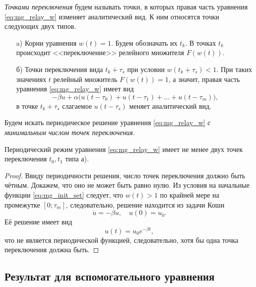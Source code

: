 \emph{Точками переключения} будем называть точки, в которых правая часть уравнения \eqref{eq:mg_relay_w} изменяет аналитический вид. К ним относятся точки следующих двух типов.
\begin{enumerate}
	\item[a)] Корни уравнения $w(t) = 1$. Будем обозначать их $t_k$.
	В точках $t_k$ происходит <<переключение>> релейного множителя $F(w(t))$.
	\item[б)] Точки переключения вида $t_k + \tau_s$ при условии $w(t_k + \tau_s) < 1$. При таких значениях $t$ релейный множитель $F(w(t)) = 1$, а значит, правая часть уравнения \eqref{eq:mg_relay_w} имеет вид
	\begin{equation*}
		-\beta u+\alpha \big(u(t-\tau_0)+u(t-\tau_1)+\ldots+u(t-\tau_{m})\big),
	\end{equation*}
	в точке $t_k + \tau_s$ слагаемое $u(t - \tau_s)$ меняет аналитический вид.
\end{enumerate}

Будем искать периодическое решение уравнения \eqref{eq:mg_relay_w} \emph{с минимальным числом точек переключения}.

\begin{theorem}
	\label{prop:switching_points_2}
	Периодический режим уравнения \eqref{eq:mg_relay_w} имеет не менее двух точек переключения $t_0, t_1$ типа а).
\end{theorem}
\begin{proof}
	Ввиду периодичности решения, число точек переключения должно быть чётным. Докажем, что оно не может быть равно нулю. Из условия на начальные функции \eqref{eq:mg_init_set} следует, что $w(t) > 1$ по крайней мере на промежутке $[0; \tau_m]$, следовательно, решение находится из задачи Коши
	\begin{equation*}
		\dot{u} = -\beta u, \quad u(0) = u_0.
	\end{equation*}
	Её решение имеет вид
	\begin{equation*}
		u(t) = u_0 e^{-\beta t},
	\end{equation*}
	что не является периодической функцией, следовательно, хотя бы одна точка переключения должна быть.
\end{proof}


\subsection{Результат для вспомогательного уравнения}\label{sec:ch2/sect2/subsect_aux_result}

